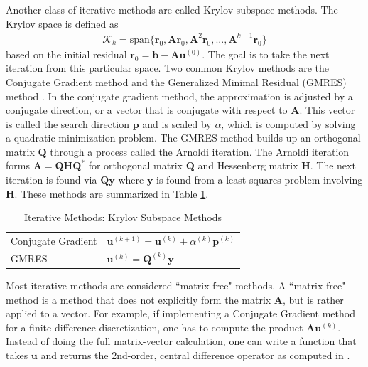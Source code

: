 Another class of iterative methods are called Krylov subspace methods. The Krylov space is defined as
\begin{align}
\mathcal{K}_k = \text{span} \{ \textbf{r}_0, \textbf{A} \textbf{r}_0, \textbf{A}^2 \textbf{r}_0, ..., \textbf{A}^{k-1} \textbf{r}_0 \}
\end{align}
based on the initial residual $\textbf{r}_0 = \textbf{b} - \textbf{A} \textbf{u}^{(0)}$. The goal is to take the next iteration from this particular space. Two common Krylov methods are the Conjugate Gradient method \citep{hestenes1952methods} and the Generalized Minimal Residual (GMRES) method \citep{saad1986gmres}. In the conjugate gradient method, the approximation is adjusted by a conjugate direction, or a vector that is conjugate with respect to $\textbf{A}$. This vector is called the search direction $\textbf{p}$ and is scaled by $\alpha$, which is computed by solving a quadratic minimization problem. The GMRES method builds up an orthogonal matrix $\textbf{Q}$ through a process called the Arnoldi iteration. The Arnoldi iteration forms $\textbf{A} = \textbf{Q} \textbf{H} \textbf{Q}^*$ for orthogonal matrix $\textbf{Q}$ and Hessenberg matrix $\textbf{H}$. The next iteration is found via $\textbf{Q} \textbf{y}$ where $\textbf{y}$ is found from a least squares problem involving $\textbf{H}$. These methods are summarized in Table \ref{tab:ksm}.

\begin{table}[h!]
    \centering
    \begin{tabular}{ | l | l |}
        \hline
        Conjugate Gradient & $\textbf{u}^{(k+1)} = \textbf{u}^{(k)} + \alpha^{(k)} \textbf{p}^{(k)}$ \\
        GMRES & $\textbf{u}^{(k)} = \textbf{Q}^{(k)} \textbf{y}$ \\
        \hline
    \end{tabular}
    \caption{Iterative Methods: Krylov Subspace Methods}
    \label{tab:ksm}
\end{table}

Most iterative methods are considered ``matrix-free" methods. A ``matrix-free" method is a method that does not explicitly form the matrix $\textbf{A}$, but is rather applied to a vector. For example, if implementing a Conjugate Gradient method for a finite difference discretization, one has to compute the product $\textbf{A} \textbf{u}^{(k)}$. Instead of doing the full matrix-vector calculation, one can write a function that takes $\textbf{u}$ and returns the 2nd-order, central difference operator as computed in .

